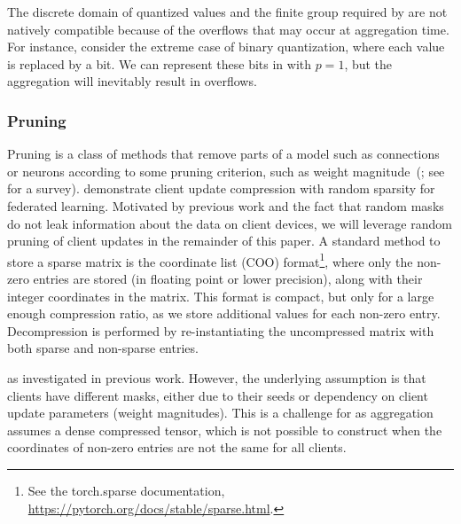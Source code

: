 The discrete domain of quantized values and the finite group required by \SecAgg are not natively compatible because of the overflows that may occur at aggregation time. For instance, consider the extreme case of binary quantization, where each value is replaced by a bit.
We can represent these bits in \SecAgg with $p=1$, but the aggregation will inevitably result in overflows.

\subsubsection{Pruning}
\label{subsec:rp}

Pruning is a class of methods that remove parts of a model such as connections or neurons according to some pruning criterion, such as weight magnitude~(\cite{lecun1990optimal,hassabi1992second}; see \cite{Blalock20} for a survey). \cite{konen2016federated} demonstrate client update compression with random sparsity for federated learning. Motivated by previous work and the fact that random masks do not leak information about the data on client devices, we will leverage random pruning of client updates in the remainder of this paper.
A standard method to store a sparse matrix is the coordinate list (COO) format\footnote{See the  {torch.sparse documentation}, \url{https://pytorch.org/docs/stable/sparse.html}.}, where only the non-zero entries are stored (in floating point or lower precision), along with their integer coordinates in the matrix.
This format is compact, but only for a large enough compression ratio, as we store additional values for each non-zero entry.
Decompression is performed by re-instantiating the uncompressed matrix with both sparse and non-sparse entries.

 as investigated in previous work. However, the underlying assumption is that clients have different masks, either due to their seeds or dependency on client update parameters (\eg weight magnitudes). This is a challenge for \SecAgg as aggregation assumes a dense compressed tensor, which is not possible to construct when the coordinates of non-zero entries are not the same for all clients.


